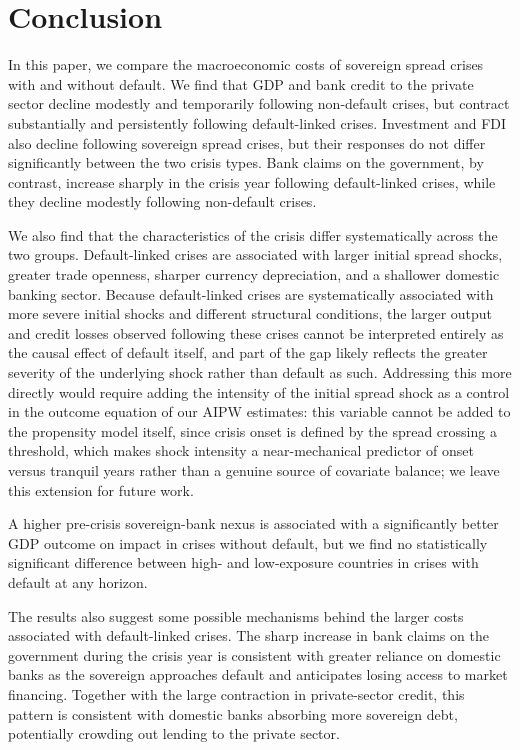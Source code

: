 \documentclass[12pt]{article}
\begin{document}
\section{Conclusion}

In this paper, we compare the macroeconomic costs of sovereign spread
crises with and without default. We find that GDP and bank credit to
the private sector decline modestly and temporarily following
non-default crises, but contract substantially and persistently
following default-linked crises. Investment and FDI also decline following
sovereign spread crises, but their responses do not differ
significantly between the two crisis types. Bank claims on the
government, by contrast, increase sharply in the crisis year following
default-linked crises, while they decline modestly following
non-default crises.

We also find that the characteristics of the crisis differ
systematically across the two groups. Default-linked crises are
associated with larger initial spread shocks, greater trade openness,
sharper currency depreciation, and a shallower domestic banking
sector. Because default-linked crises are systematically associated
with more severe initial shocks and different structural conditions,
the larger output and credit losses observed following these crises
cannot be interpreted entirely as the causal effect of default itself,
and part of the gap likely reflects the greater severity of the
underlying shock rather than default as such. Addressing this more
directly would require adding the intensity of the initial spread
shock as a control in the outcome equation of our AIPW estimates: this
variable cannot be added to the propensity model itself, since crisis
onset is defined by the spread crossing a threshold, which makes shock
intensity a near-mechanical predictor of onset versus tranquil years
rather than a genuine source of covariate balance; we leave this
extension for future work.

A higher pre-crisis sovereign-bank nexus is associated with a
significantly better GDP outcome on impact in crises without default,
but we find no statistically significant difference between high- and
low-exposure countries in crises with default at any horizon.

The results also suggest some possible mechanisms behind the larger
costs associated with default-linked crises. The sharp increase in
bank claims on the government during the crisis year is consistent
with greater reliance on domestic banks as the sovereign approaches
default and anticipates losing access to market financing. Together
with the large contraction in private-sector credit, this pattern is
consistent with domestic banks absorbing more sovereign debt,
potentially crowding out lending to the private sector.
\end{document}
